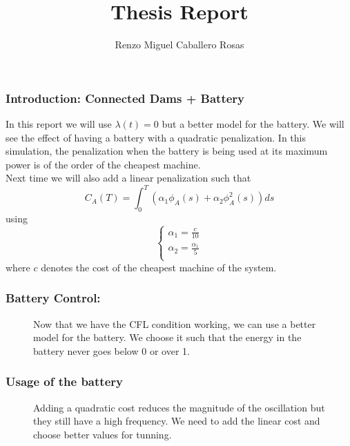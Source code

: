 \documentclass[aspectratio=169]{beamer}\usepackage[utf8]{inputenc}
\title{Thesis Report}
\subtitle{Renzo Miguel Caballero Rosas}
\begin{document}
\begin{frame}
\titlepage
\end{frame}

\begin{frame}\frametitle{Introduction: Connected Dams + Battery}
In this report we will use $\lambda(t)=0$ but a better model for the battery. We will see the effect of having a battery with a quadratic penalization. In this simulation, the penalization when the battery is being used at its maximum power is of the order of the cheapest machine.\\
Next time we will also add a linear penalization such that
\begin{equation*}
C_A(T)=\int_0^T\left(\alpha_1\phi_A(s)+\alpha_2\phi_A^2(s)\right)ds
\end{equation*}
using
\begin{equation*}
\begin{cases}
\alpha_1=\frac{c}{10}\\
\alpha_2=\frac{\alpha_1}{5}\\
\end{cases}
\end{equation*}
where $c$ denotes the cost of the cheapest machine of the system.
\end{frame}

\begin{frame}\frametitle{Battery Control:}
\begin{figure}[ht!]
\centering
{}
\caption{Now that we have the CFL condition working, we can use a better model for the battery. We choose it such that the energy in the battery never goes below 0 or over 1.}
\end{figure}
\end{frame}

\begin{frame}\frametitle{Usage of the battery}
\begin{figure}[ht!]
\centering
{}
\caption{Adding a quadratic cost reduces the magnitude of the oscillation but they still have a high frequency. We need to add the linear cost and choose better values for tunning.}
\end{figure}
\end{frame}
\end{document}
